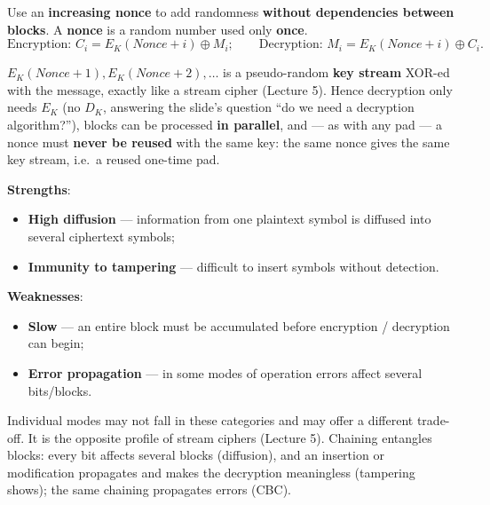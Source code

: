 \begin{defnbox}[title={Mode 3: Counter mode (CTR)}]
Use an \textbf{increasing nonce} to add randomness \textbf{without dependencies between
blocks}. A \textbf{nonce} is a random number used only \textbf{once}.
\[
  \text{Encryption: } C_i = E_K(\mathit{Nonce} + i) \oplus M_i;
  \qquad
  \text{Decryption: } M_i = E_K(\mathit{Nonce} + i) \oplus C_i .
\]
\end{defnbox}

\begin{rembox}[title=CTR turns a block cipher into a stream cipher]
$E_K(\mathit{Nonce}+1), E_K(\mathit{Nonce}+2), \ldots$ is a pseudo-random \textbf{key
stream} XOR-ed with the message, exactly like a stream cipher (Lecture 5). Hence
decryption only needs $E_K$ (no $D_K$, answering the slide's question ``do we need a
decryption algorithm?''), blocks can be processed \textbf{in parallel}, and --- as with
any pad --- a nonce must \textbf{never be reused} with the same key: the same nonce gives the
same key stream, i.e.\ a reused one-time pad.
\end{rembox}

\begin{propbox}[title=Block ciphers: strengths and weaknesses]
\textbf{Strengths}:
\begin{itemize}
  \item \textbf{High diffusion} --- information from one plaintext symbol is diffused
        into several ciphertext symbols;
  \item \textbf{Immunity to tampering} --- difficult to insert symbols without detection.
\end{itemize}
\textbf{Weaknesses}:
\begin{itemize}
  \item \textbf{Slow} --- an entire block must be accumulated before encryption /
        decryption can begin;
  \item \textbf{Error propagation} --- in some modes of operation errors affect several
        bits/blocks.
\end{itemize}
Individual modes may not fall in these categories and may offer a different trade-off.
It is the opposite profile of stream ciphers (Lecture 5). Chaining entangles blocks: every bit
affects several blocks (diffusion), and an insertion or modification propagates and makes the
decryption meaningless (tampering shows); the same chaining propagates errors (CBC).
\end{propbox}

